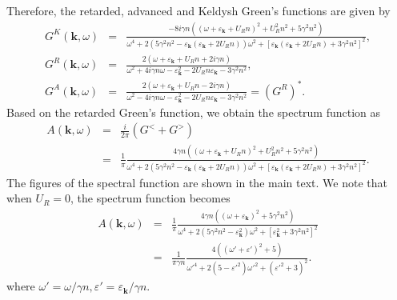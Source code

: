 \documentclass[aps,superscriptaddress,notitlepage,longbibliography]{revtex4-1}
\begin{document}
Therefore, the retarded, advanced and Keldysh Green's functions are
given by 
\begin{eqnarray}
G^{K}(\bm{k},\omega) & = & \frac{-8i\gamma n((\omega+\varepsilon_{\bm{k}}+U_{R}n)^{2}+U_{R}^{2}n^{2}+5\gamma^{2}n^{2})}{\omega^{4}+2(5\gamma^{2}n^{2}-\varepsilon_{\bm{k}}(\varepsilon_{\bm{k}}+2U_{R}n))\omega^{2}+[\varepsilon_{\bm{k}}(\varepsilon_{\bm{k}}+2U_{R}n)+3\gamma^{2}n^{2}]^{2}},\\
G^{R}(\bm{k},\omega) & = & \frac{2(\omega+\varepsilon_{\bm{k}}+U_{R}n+2i\gamma n)}{\omega^{2}+4i\gamma n\omega-\varepsilon_{\bm{k}}^{2}-2U_{R}n\varepsilon_{\bm{k}}-3\gamma^{2}n^{2}},\\
G^{A}(\bm{k},\omega) & = & \frac{2(\omega+\varepsilon_{\bm{k}}+U_{R}n-2i\gamma n)}{\omega^{2}-4i\gamma n\omega-\varepsilon_{\bm{k}}^{2}-2U_{R}n\varepsilon_{\bm{k}}-3\gamma^{2}n^{2}}=(G^{R})^{\ast}.
\end{eqnarray}
Based on the retarded Green's function, we obtain the spectrum function
as \citep{Coleman_2015}
\begin{eqnarray}
A(\bm{k},\omega) & = & \frac{i}{2\pi}(G^{<}+G^{>})\nonumber \\
 & = & \frac{1}{\pi}\frac{4\gamma n((\omega+\varepsilon_{\bm{k}}+U_{R}n)^{2}+U_{R}^{2}n^{2}+5\gamma^{2}n^{2})}{\omega^{4}+2(5\gamma^{2}n^{2}-\varepsilon_{\bm{k}}(\varepsilon_{\bm{k}}+2U_{R}n))\omega^{2}+[\varepsilon_{\bm{k}}(\varepsilon_{\bm{k}}+2U_{R}n)+3\gamma^{2}n^{2}]^{2}}.
\end{eqnarray}
The figures of the spectral function are shown in the main text. We
note that when $U_{R}=0$, the spectrum function becomes 
\begin{eqnarray*}
A(\bm{k},\omega) & = & \frac{1}{\pi}\frac{4\gamma n((\omega+\varepsilon_{\bm{k}})^{2}+5\gamma^{2}n^{2})}{\omega^{4}+2(5\gamma^{2}n^{2}-\varepsilon_{\bm{k}}^{2})\omega^{2}+[\varepsilon_{\bm{k}}^{2}+3\gamma^{2}n^{2}]^{2}}\\
 & = & \frac{1}{\pi\gamma n}\frac{4((\omega'+\varepsilon')^{2}+5)}{{\omega'}^{4}+2\left({5-\varepsilon'}^{2}\right){\omega'}^{2}+\left({\varepsilon'}^{2}+3\right)^{2}}.
\end{eqnarray*}
where $\omega'=\omega/\gamma n,\varepsilon'=\varepsilon_{\bm{k}}/\gamma n$.
\end{document}
